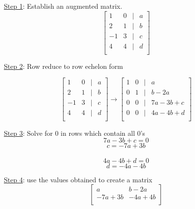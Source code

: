 \documentclass[12pt]{article}
\begin{document}
\underline{Step 1}: Establish an augmented matrix.
\[
\begin{bmatrix}
	1  & 0 & | &a\\
	2  & 1 & | & b\\
	-1  & 3 & | & c\\
	4  & 4 & | & d\\
\end{bmatrix}
\]

\underline{Step 2}: Row reduce to row echelon form

\[
\begin{bmatrix}
1  & 0 & | &a\\
2  & 1 & | & b\\
-1  & 3 & | & c\\
4  & 4 & | & d\\
\end{bmatrix}
\rightarrow
\begin{bmatrix}
1  & 0 & | &a\\
0  & 1 & | & b - 2a\\
0  & 0 & | & 7a - 3b + c\\
0  & 0 & | & 4a - 4b + d\\
\end{bmatrix}
\]

\underline{Step 3}: Solve for 0 in rows which contain all 0's
\[
7a - 3b + c = 0
\]
\[
c = -7a + 3b
\]
\hfill
\\
\[
4a - 4b + d = 0
\]
\[
d = -4a - 4b
\]

\underline{Step 4}: use the values obtained to create a matrix
\[
\begin{bmatrix}
	a & b-2a \\
	-7a + 3b & -4a + 4b \\
\end{bmatrix}
\]
\end{document}
